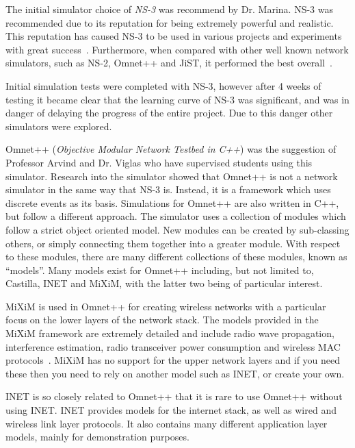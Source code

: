         The initial simulator choice of \emph{NS-3} was recommend by Dr. Marina. NS-3 was recommended due to its reputation for being extremely powerful and realistic. This reputation has caused NS-3 to be used in various projects and experiments with great success~\cite{highperformancesimulatorofadhocnetworks}.  Furthermore, when compared with other well known network simulators, such as NS-2, Omnet++ and JiST, it performed the best overall~\cite{networksimulatorcomparison}. 

        Initial simulation tests were completed with NS-3, however after 4 weeks of testing it became clear that the learning curve of NS-3 was significant, and was in danger of delaying the progress of the entire project. Due to this danger other simulators were explored. 

        Omnet++ (\emph{Objective Modular Network Testbed in C++}) was the suggestion of Professor Arvind and Dr. Viglas who have supervised students using this simulator. Research into the simulator showed that Omnet++ is not a network simulator in the same way that NS-3 is. Instead, it is a framework which uses discrete events as its basis. Simulations for Omnet++ are also written in C++, but follow a different approach. The simulator uses a collection of modules which follow a strict object oriented model. New modules can be created by sub-classing others, or simply connecting them together into a greater module. With respect to these modules, there are many different collections of these modules, known as ``models''. Many models exist for Omnet++ including, but not limited to, Castilla, INET and MiXiM, with the latter two being of particular interest. 

        MiXiM is used in Omnet++ for creating wireless networks with a particular focus on the lower layers of the network stack. The models provided in the MiXiM framework are extremely detailed and include radio wave propagation, interference estimation, radio transceiver power consumption and wireless MAC protocols~\cite{miximvision}. MiXiM has no support for the upper network layers and if you need these then you need to rely on another model such as INET, or create your own. 

        INET is so closely related to Omnet++ that it is rare to use Omnet++ without using INET. INET provides models for the internet stack, as well as wired and wireless link layer protocols. It also contains many different application layer models, mainly for demonstration purposes.  


